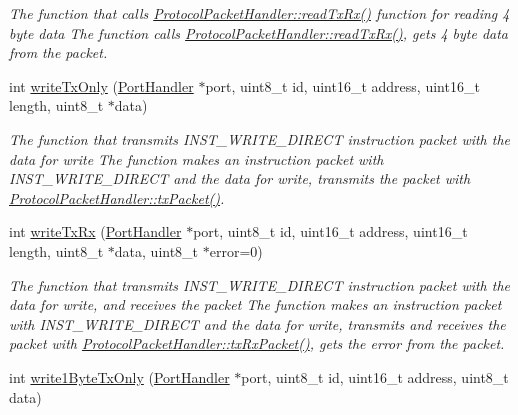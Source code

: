 \begin{DoxyCompactItemize}
\begin{DoxyCompactList}\small\item\em The function that calls \hyperlink{classmercury_1_1_protocol_packet_handler_a368325ca9c0c783b1e88ef32a4544e51}{Protocol\+Packet\+Handler\+::read\+Tx\+Rx()} function for reading 4 byte data  The function calls \hyperlink{classmercury_1_1_protocol_packet_handler_a368325ca9c0c783b1e88ef32a4544e51}{Protocol\+Packet\+Handler\+::read\+Tx\+Rx()},  gets 4 byte data from the packet. \end{DoxyCompactList}\item 
int \hyperlink{classmercury_1_1_protocol_packet_handler_adf6e96b412135484dac0ff7ff9c2bf36}{write\+Tx\+Only} (\hyperlink{classmercury_1_1_port_handler}{Port\+Handler} $\ast$port, uint8\+\_\+t id, uint16\+\_\+t address, uint16\+\_\+t length, uint8\+\_\+t $\ast$data)
\begin{DoxyCompactList}\small\item\em The function that transmits I\+N\+S\+T\+\_\+\+W\+R\+I\+T\+E\+\_\+\+D\+I\+R\+E\+CT instruction packet with the data for write  The function makes an instruction packet with I\+N\+S\+T\+\_\+\+W\+R\+I\+T\+E\+\_\+\+D\+I\+R\+E\+CT and the data for write,  transmits the packet with \hyperlink{classmercury_1_1_protocol_packet_handler_a245f01395d9684bc58788e8a06de3ffc}{Protocol\+Packet\+Handler\+::tx\+Packet()}. \end{DoxyCompactList}\item 
int \hyperlink{classmercury_1_1_protocol_packet_handler_a13921f2ddae0c1f1f7ac3669d1a15470}{write\+Tx\+Rx} (\hyperlink{classmercury_1_1_port_handler}{Port\+Handler} $\ast$port, uint8\+\_\+t id, uint16\+\_\+t address, uint16\+\_\+t length, uint8\+\_\+t $\ast$data, uint8\+\_\+t $\ast$error=0)
\begin{DoxyCompactList}\small\item\em The function that transmits I\+N\+S\+T\+\_\+\+W\+R\+I\+T\+E\+\_\+\+D\+I\+R\+E\+CT instruction packet with the data for write, and receives the packet  The function makes an instruction packet with I\+N\+S\+T\+\_\+\+W\+R\+I\+T\+E\+\_\+\+D\+I\+R\+E\+CT and the data for write,  transmits and receives the packet with \hyperlink{classmercury_1_1_protocol_packet_handler_a68b02f23af616886d0795ea12debd613}{Protocol\+Packet\+Handler\+::tx\+Rx\+Packet()},  gets the error from the packet. \end{DoxyCompactList}\item 
int \hyperlink{classmercury_1_1_protocol_packet_handler_a5552ae2bbb808624a5f8853a6c350c6a}{write1\+Byte\+Tx\+Only} (\hyperlink{classmercury_1_1_port_handler}{Port\+Handler} $\ast$port, uint8\+\_\+t id, uint16\+\_\+t address, uint8\+\_\+t data)

\end{DoxyCompactItemize}
